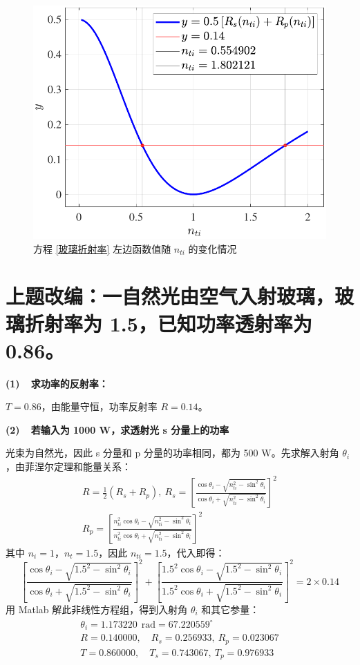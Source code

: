 \documentclass[a4paper]{article}  %
\theoremstyle{MyLineTheoremStyle} %
\theoremstyle{MyBlockTheoremStyle} %
\theoremstyle{MySubsubsectionStyle} %
\begin{document}
\begin{multicols*}{4}
\begin{figure}[H]\centering
    \includegraphics[width=0.8\linewidth]{assets/2024-09-18_01-08-40.pdf}
    \caption{ 方程 \ref{玻璃折射率} 左边函数值随 $n_{ti}$ 的变化情况}\label{方程左边的变化情况}
    \end{figure}


\section{上题改编：一自然光由空气入射玻璃，玻璃折射率为 1.5，已知功率透射率为 0.86。}
\textbf{(1)\ \ 求功率的反射率：}

$T = 0.86$，由能量守恒，功率反射率 $R = 0.14$。

\textbf{(2)\ \ 若输入为 1000 W，求透射光 s 分量上的功率}

光束为自然光，因此 s 分量和 p 分量的功率相同，都为 500 W。先求解入射角 $\theta_i$，由菲涅尔定理和能量关系：
\begin{gather}
R =  \frac{1}{2}(R_s + R_p),\  R_s =  \left[ \frac{ \cos \theta_i - \sqrt{n_{ti}^2 - \sin^2 \theta_i} }{\cos \theta_i + \sqrt{n_{ti}^2 - \sin^2 \theta_i}} \right]^2 
\\ 
R_p = \left[ \frac{ n_{ti}^2\cos \theta_i - \sqrt{n_{ti}^2 - \sin^2 \theta_i} }{n_{ti}^2\cos \theta_i + \sqrt{n_{ti}^2 - \sin^2 \theta_i}} \right]^2
\end{gather}
其中 $n_i = 1$，$n_t = 1.5$，因此 $n_{ti} = 1.5$，代入即得：
\begin{equation}
    \left[ \frac{ \cos \theta_i - \sqrt{1.5^2 - \sin^2 \theta_i} }{\cos \theta_i + \sqrt{1.5^2 - \sin^2 \theta_i}} \right]^2 + \left[ \frac{ 1.5^2\cos \theta_i - \sqrt{1.5^2 - \sin^2 \theta_i} }{1.5^2\cos \theta_i + \sqrt{1.5^2 - \sin^2 \theta_i}} \right]^2 = 2\times0.14
\end{equation}
用 Matlab 解此非线性方程组，得到入射角 $\theta_i$ 和其它参量：
\begin{gather}\label{解入射角}
\begin{matrix}
    \theta_i =  1.173220\ \ \mathrm{rad}  = 67.220559^\circ \\
    R = 0.140000,\quad   R_s = 0.256933,\    R_p = 0.023067 \\ 
    T = 0.860000,\quad   T_s = 0.743067,\    T_p = 0.976933
\end{matrix}
\end{gather}


\end{multicols*}
\end{document}

